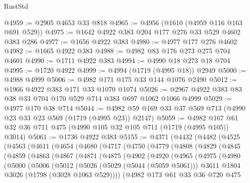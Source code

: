 \begin{lexlean}{RustStd}
\begin{coremodule}
{\begin{coremodule}
{{{{{{{{{{{{@4959 := @2905 @4653 @33 @818
@4965 := @4956 (@1610 (@4959 @116 @163 @691 @529))
@4975 := @1642 @4922 @383 @204 @177 @276 @33 @529 @4602 @383 @286
@4977 := @1656 @4922 @383
@4980 := @4977 @177 @276 @4602
@4982 := @1665 @4922 @383
@4988 := @4982 @83 @176 @273 @275 @704 @4601
@4990 := @1711 @4922 @383
@4994 := @4990 @18 @273 @18 @704
@4995 := @1720 @4922
@4999 := @4994 (@1719 (@4995 @18)) @2949
@5000 := @4988 @4999
@5006 := @4982 @171 @175 @33 @144 @1076 @2490
@5012 := @1966 @4922 @383 @171 @33 @1070 @1074
@5026 := @2967 @4922 @383 @83 @38 @33 @704 @170 @529 @714 @383 @697 @1062 @1066 @4999
@5029 := @4977 @170 @38 @714
@5044 := @4982 @59 @169 @33 @37 @569 @713 (@4990 @23 @33 @23 @569 (@1719 (@4995 @23)) @2147)
@5059 := @4982 @167 @61 @32 @36 @711 @475 (@4990 @105 @32 @105 @711 (@1719 (@4995 @105)) @3014)
@5061 := @1736 @4922 @383
@5155 := @4371
    (@4432
      (@4482
        (@4525
          (@4563
            (@4611
              (@4654
                (@4680
                  (@4717
                    (@4750
                      (@4779
                        (@4808
                          (@4829
                            (@4845
                              (@4859
                                (@4863
                                  (@4867
                                    (@4871
                                      (@4875
                                        (@4902
                                          (@4920
                                            (@4965
                                              (@4975
                                                (@4980
                                                  (@5000
                                                    (@5006
                                                      (@5012
                                                        (@5026
                                                          (@5029 (@5044 (@5059 @5061)))
                                                          @3611
                                                          @1804
                                                          @3026
                                                          (@1798 (@3028 @1063 @529))))
                                                      (@4982
                                                        @173
                                                        @61
                                                        @33
                                                        @36
                                                        @720
                                                        @475
}}}}}}}}}}}}
\end{coremodule}}
\end{coremodule}
\end{lexlean}
